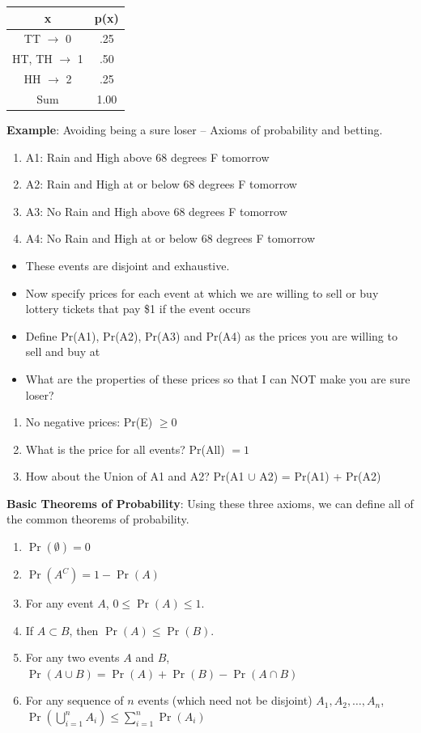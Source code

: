 \documentclass[11pt]{article}
\newcommand{\bi}{\begin{itemize}}
\newcommand{\ei}{\end{itemize}}
\newcommand{\be}{\begin{enumerate}}
\newcommand{\ee}{\end{enumerate}}
\begin{document}
\begin{center}
\begin{tabular}{c | c}
\hline
x & p(x) \\
\hline
{TT} $\rightarrow$ 0 & .25 \\
{HT, TH} $\rightarrow$ 1 & .50 \\
{HH} $\rightarrow$ 2 & .25\\
\hline
Sum & 1.00 \\
\hline
\end{tabular}
\end{center}

\item {\bf Example}: Avoiding being a sure loser -- Axioms of probability and betting.
\be
\item A1: Rain and High above 68 degrees F tomorrow
\item A2: Rain and High at or below 68 degrees F tomorrow
\item A3: No Rain and High above 68 degrees F tomorrow
\item A4: No Rain and High at or below 68 degrees F tomorrow
\ee
\bi
\item These events are disjoint and exhaustive. 
\item Now specify prices for each event at which we are willing to sell or buy lottery tickets that pay \$1 if the event occurs
\item Define Pr(A1), Pr(A2), Pr(A3) and Pr(A4) as the prices you are willing to sell and buy at
\item What are the properties of these prices so that I can NOT make you are sure loser?
\ei
\be
\item No negative prices: Pr(E) $\geq 0$
\item What is the price for all events? Pr(All) $=1$
\item How about the Union of A1 and A2? Pr(A1 $\cup$ A2) = Pr(A1) + Pr(A2)
\ee

\item {\bf Basic Theorems of Probability}: Using these three axioms,
  we can define all of the common theorems of probability.  \be
  \item $\Pr(\emptyset)=0$
  \item $\Pr({A}^C)=1-\Pr(A)$
  \item For any event $A$, $0\le \Pr(A) \le 1$.
  \item If $A\subset B$, then $\Pr(A)\le \Pr(B)$.
  \item For any two events $A$ and $B$, $\Pr(A\cup
B)=\Pr(A)+\Pr(B)-\Pr(A\cap B)$
  \item For any sequence of $n$ events (which need not be disjoint)
$A_1,A_2,\ldots,A_n$,\\
$\Pr\left( \bigcup\limits_{i=1}^n
A_i\right) \leq \sum\limits_{i=1}^n \Pr(A_i)$
  \ee
\end{document}

